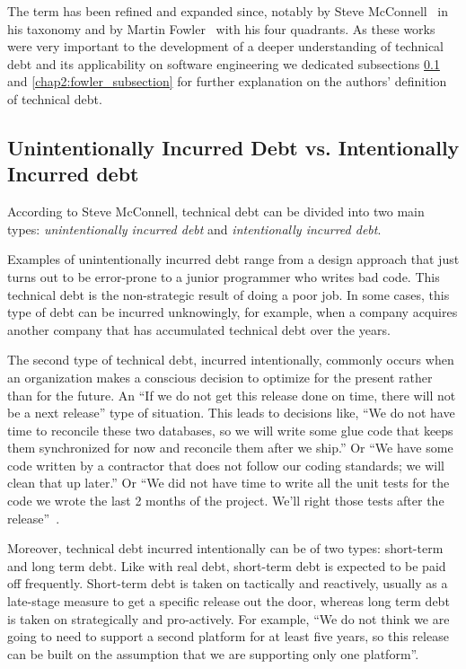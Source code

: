 The term has been refined and expanded since, notably by Steve McConnell~\cite{McConnell07:TechnicalDebt} in his taxonomy and by Martin Fowler~\cite{MartinFowler:TechnicalDebtQuadrant} with his four quadrants. As these works were very important to the development of a deeper understanding of technical debt and its applicability on software engineering we dedicated subsections \ref{chap2:mcconnel_subsection} and \ref{chap2:fowler_subsection} for further explanation on the authors' definition of technical debt. 

\subsection{Unintentionally Incurred Debt vs. Intentionally Incurred debt}
\label{chap2:mcconnel_subsection}

According to Steve McConnell, technical debt can be divided into two main types: \textit{unintentionally incurred debt} and \textit{intentionally incurred debt}.

Examples of unintentionally incurred debt range from a design approach that just turns out to be error-prone to a junior programmer who writes bad code. This technical debt is the non-strategic result of doing a poor job. In some cases, this type of debt can be incurred unknowingly, for example, when a company acquires another company that has accumulated technical debt over the years. 

The second type of technical debt, incurred intentionally, commonly occurs when an organization makes a conscious decision to optimize for the present rather than for the future. An ``If we do not get this release done on time, there will not be a next release'' type of situation. This leads to decisions like, ``We do not have time to reconcile these two databases, so we will write some glue code that keeps them synchronized for now and reconcile them after we ship.'' Or ``We have some code written by a contractor that does not follow our coding standards; we will clean that up later.'' Or ``We did not have time to write all the unit tests for the code we wrote the last 2 months of the project. We'll right those tests after the release''~\cite{McConnell07:TechnicalDebt}. 

Moreover, technical debt incurred intentionally can be of two types: short-term and long term debt. Like with real debt, short-term debt is expected to be paid off frequently. Short-term debt is taken on tactically and reactively, usually as a late-stage measure to get a specific release out the door, whereas long term debt is taken on strategically and pro-actively. For example, ``We do not think we are going to need to support a second platform for at least five years, so this release can be built on the assumption that we are supporting only one platform''.

